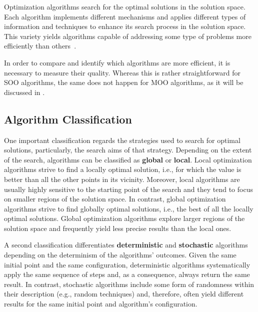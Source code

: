 	Optimization algorithms search for the optimal solutions in the solution space. Each algorithm implements different mechanisms and applies different types of information and techniques to enhance its search process in the solution space. This variety yields algorithms capable of addressing some type of problems more efficiently than others~\cite{Wolpert1997NFLT}.
	
	In order to compare and identify which algorithms are more efficient, it is necessary to measure their quality. Whereas this is rather straightforward for \ac{SOO} algorithms, the same does not happen for \ac{MOO} algorithms, as it will be discussed in .
	
	\subsection{Algorithm Classification}
	
	One important classification regards the strategies used to search for optimal solutions, particularly, the search aims of that strategy. Depending on the extent of the search, algorithms can be classified as \textbf{global} or \textbf{local}. Local optimization algorithms strive to find a locally optimal solution, i.e., for which the value is better than all the other points in its vicinity. Moreover, local algorithms are usually highly sensitive to the starting point of the search and they tend to focus on smaller regions of the solution space. In contrast, global optimization algorithms strive to find globally optimal solutions, i.e., the best of all the locally optimal solutions. Global optimization algorithms explore larger regions of the solution space and frequently yield less precise results than the local ones.
		
	A second classification differentiates \textbf{deterministic} and \textbf{stochastic} algorithms depending on the determinism of the algorithms' outcomes. Given the same initial point and the same configuration, deterministic algorithms systematically apply the same sequence of steps and, as a consequence, always return the same result. In contrast, stochastic algorithms include some form of randomness within their description (e.g., random techniques) and, therefore, often yield different results for the same initial point and algorithm's configuration.
		
